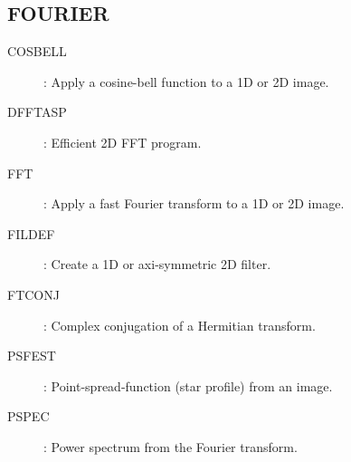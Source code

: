 \subsection {FOURIER}
\begin{description}
\begin{description}
\item [COSBELL]: Apply a cosine-bell function to a 1D or 2D image.
\item [DFFTASP]: Efficient 2D FFT program.
\item [FFT]: Apply a fast Fourier transform to a 1D or 2D image.
\item [FILDEF]: Create a 1D or axi-symmetric 2D filter.
\item [FTCONJ]: Complex conjugation of a Hermitian transform.
\item [PSFEST]: Point-spread-function (star profile) from an image.
\item [PSPEC]: Power spectrum from the Fourier transform.
\end{description}
\end{description}
